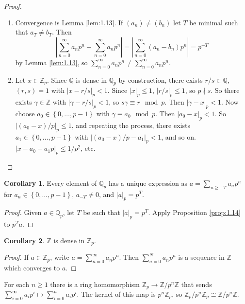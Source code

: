 \documentclass{article}
\newcommand{\Z}{\mathbb{Z}}
\newcommand{\Q}{\mathbb{Q}}
\newcommand{\rb}[1]{\left( #1 \right)}
\newcommand{\cb}[1]{\left\{ #1 \right\}}
\newcommand{\abs}[1]{\left\lvert #1 \right\rvert}
\theoremstyle{definition}\newtheorem{definition}{Definition}[section]
\theoremstyle{definition}\newtheorem{remark}[definition]{Remark}
\theoremstyle{definition}\newtheorem*{example}{Example}
\theoremstyle{definition}\newtheorem*{note}{Note}
\newtheorem{corollary}[definition]{Corollary}
\begin{document}
\begin{proof}
\hfill
\begin{enumerate}
\item Convergence is Lemma \ref{lem:1.13}. If $ \rb{a_n} \ne \rb{b_n} $ let $ T $ be minimal such that $ a_T \ne b_T $. Then
$$ \abs{\sum_{n = 0}^\infty a_np^n - \sum_{n = 0}^\infty a_np^n} = \abs{\sum_{n = 0}^\infty \rb{a_n - b_n}p^n} = p^{-T} $$
by Lemma \ref{lem:1.13}, so $ \sum_{n = 0}^\infty a_np^n \ne \sum_{n = 0}^\infty a_np^n $.
\item Let $ x \in \Z_p $. Since $ \Q $ is dense in $ \Q_p $ by construction, there exists $ r / s \in \Q $, $ \rb{r, s} = 1 $ with $ \abs{x - r / s}_p < 1 $. Since $ \abs{x}_p \le 1 $, $ \abs{r / s}_p \le 1 $, so $ p \nmid s $. So there exists $ \gamma \in \Z $ with $ \abs{\gamma - r / s}_p < 1 $, so $ s\gamma \equiv r \mod p $. Then $ \abs{\gamma - x}_p < 1 $. Now choose $ a_0 \in \cb{0, \dots, p - 1} $ with $ \gamma \equiv a_0 \mod p $. Then $ \abs{a_0 - x}_p < 1 $. So $ \abs{\rb{a_0 - x} / p}_p \le 1 $, and repeating the process, there exists $ a_1 \in \cb{0, \dots, p - 1} $ with $ \abs{\rb{a_0 - x} / p - a_1}_p < 1 $, and so on. $ \abs{x - a_0 - a_1p}_p \le 1 / p^2 $, etc.
\end{enumerate}
\end{proof}


\begin{corollary}
Every element of $ \Q_p $ has a unique expression as $ a = \sum_{n \ge -T} a_np^n $ for $ a_n \in \cb{0, \dots, p - 1} $, $ a_{-T} \ne 0 $, and $ \abs{a}_p = p^T $.
\end{corollary}

\begin{proof}
Given $ a \in \Q_p $, let $ T $ be such that $ \abs{a}_p = p^T $. Apply Proposition \ref{prop:1.14} to $ p^Ta $.
\end{proof}

\begin{corollary}
$ \Z $ is dense in $ \Z_p $.
\end{corollary}

\begin{proof}
If $ a \in \Z_p $, write $ a = \sum_{n = 0}^\infty a_np^n $. Then $ \sum_{n = 0}^N a_np^n $ is a sequence in $ \Z $ which converges to $ a $.
\end{proof}

For each $ n \ge 1 $ there is a ring homomorphism $ \Z_p \to \Z / p^n\Z $ that sends $ \sum_{i = 0}^\infty a_ip^i \mapsto \sum_{i = 0}^n a_ip^i $. The kernel of this map is $ p^n\Z_p $, so $ \Z_p / p^n\Z_p \cong \Z / p^n\Z $.
\end{document}
